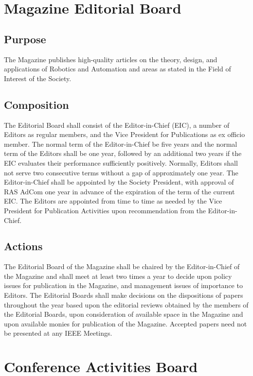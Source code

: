 \documentclass[10pt]{article}
\begin{document}
\section{Magazine Editorial Board}
\subsection{Purpose}

The Magazine publishes high-quality articles on the theory, design, and applications of Robotics and Automation and areas as stated in the Field of Interest of the Society.


\subsection{Composition}
\label{MEB:Composition}
The Editorial Board shall consist of the Editor-in-Chief (EIC), a number of Editors as regular members, and the Vice President for Publications as ex officio member.  The normal term of the Editor-in-Chief be five years and the normal term of the Editors shall be one year, followed by an additional two years if the EIC evaluates their performance sufficiently positively. Normally, Editors shall not serve two consecutive terms without a gap of approximately one year.  The Editor-in-Chief shall be appointed by the Society President, with approval of RAS AdCom one year in advance of the expiration of the term of the current EIC.  The Editors are appointed from time to time as needed by the Vice President for Publication Activities upon recommendation from the Editor-in-Chief.


\subsection{Actions}
The Editorial Board of the Magazine shall be chaired by the Editor-in-Chief of the Magazine and shall meet at least two times a year to decide upon policy issues for publication in the Magazine, and management issues of importance to Editors.  The Editorial Boards shall make decisions on the dispositions of papers throughout the year based upon the editorial reviews obtained by the members of the Editorial Boards, upon consideration of available space in the Magazine and upon available monies for publication of the Magazine. Accepted papers need not be presented at any IEEE Meetings.


\section{Conference Activities Board}
\label{CAB}
\end{document}
